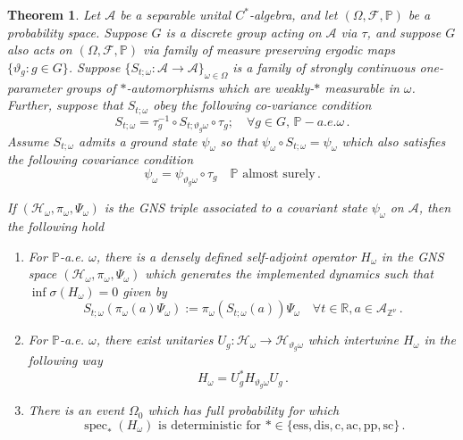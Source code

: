 \documentclass{article}
\newcommand{\Znu}{\mathbb{Z}^\nu}
\newcommand{\A}{\mathcal{A}}
\renewcommand{\P}{\mathbb{P}}
\newcommand{\<}{\langle}
\renewcommand{\>}{\rangle}
\DeclareMathOperator{\spec}{spec}
\newtheorem{thm}{Theorem}[section]
\theoremstyle{definition}
\numberwithin{equation}{section}
\begin{document}
\begin{thm}\label{thm:spatial_covariance}
    Let $\A$ be a separable unital $C^*$-algebra, and let $(\Omega, \mathcal{F}, \P)$ be a probability space. Suppose $G$ is a discrete group acting on $\A$ via $\tau$, and suppose $G$ also acts on  $(\Omega, \mathcal{F}, \P)$ via family of measure preserving ergodic maps $\{\vartheta_g : g\in G\}$. Suppose $\{S_{t;\omega}\colon \A\to \A\}_{\omega \in \Omega}$ is a family of strongly continuous one-parameter groups of $*$-automorphisms which are weakly-$\ast$ measurable in $\omega$. Further, suppose that $S_{t; \omega}$ obey the following co-variance condition 
        \begin{equation}
            S_{t;\omega} = \tau_g^{-1} \circ S_{t;\vartheta_g\omega} \circ \tau_g; \quad \forall g\in G,\, \P-a.e. \omega\,.
        \end{equation} Assume $S_{t;\omega}$ admits a ground state $\psi_\omega$ so that $\psi_\omega\circ S_{t;\omega} = \psi_\omega$ which also satisfies the following covariance condition
        \begin{equation}
            \psi_\omega = \psi_{\vartheta_g \omega}\circ \tau_g\quad  \text{$\P$ almost surely}\,.
        \end{equation} 
        
        If $(\mathcal{H}_\omega, \pi_\omega, \Psi_\omega)$ is the GNS triple associated to a covariant state $\psi_\omega$ on $\A$, then the following hold
        \begin{enumerate}
            \item For $\P$-a.e. $\omega$, there is a densely defined self-adjoint operator $H_\omega$ in the GNS space $(\mathcal{H}_\omega, \pi_\omega, \Psi_\omega)$ which generates the implemented dynamics such that $\inf \sigma(H_\omega) = 0$ given by 
            \[
                S_{t;\omega}(\pi_\omega(a)\Psi_\omega) := \pi_\omega(S_{t;\omega}(a)) \Psi_\omega \quad \forall t\in \mathbb{R}, a\in \A_{\Znu}\,.
            \]
            \item For $\P$-a.e. $\omega$, there exist unitaries $U_g: \mathcal{H}_\omega \to \mathcal{H}_{\vartheta_g\omega}$ which intertwine $H_\omega$ in the following way
            \begin{equation}
                H_\omega = U_g^* H_{\vartheta_g \omega} U_g\,.
            \end{equation}
            \item There is an event $\Omega_0$ which has full probability for which 
    \begin{equation}
        \spec_{*}(H_\omega) \text{ is deterministic for }*\in \{\mathrm{ess}, \mathrm{dis}, \mathrm{c}, \mathrm{ac}, \mathrm{pp}, \mathrm{sc}\}\,.
    \end{equation}
        \end{enumerate} 
\end{thm}
\end{document}
